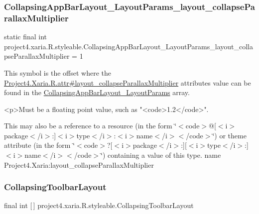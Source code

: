 \subsubsection{\texorpdfstring{Collapsing\+App\+Bar\+Layout\+\_\+\+Layout\+Params\+\_\+layout\+\_\+collapse\+Parallax\+Multiplier}{CollapsingAppBarLayout\_LayoutParams\_layout\_collapseParallaxMultiplier}}
{\footnotesize\ttfamily static final int project4.\+xaria.\+R.\+styleable.\+Collapsing\+App\+Bar\+Layout\+\_\+\+Layout\+Params\+\_\+layout\+\_\+collapse\+Parallax\+Multiplier = 1\hspace{0.3cm}{\ttfamily [static]}}

This symbol is the offset where the \hyperlink{}{Project4.\+Xaria.\+R.\+attr\#layout\+\_\+collapse\+Parallax\+Multiplier} attribute\textquotesingle{}s value can be found in the \hyperlink{classproject4_1_1xaria_1_1R_1_1styleable_a22d4439a4550b11fcac1b86a5aaca608}{Collapsing\+App\+Bar\+Layout\+\_\+\+Layout\+Params} array.

\begin{DoxyVerb}      <p>Must be a floating point value, such as "<code>1.2</code>".
\end{DoxyVerb}
 

This may also be a reference to a resource (in the form \char`\"{}$<$code$>$@\mbox{[}$<$i$>$package$<$/i$>$\+:\mbox{]}$<$i$>$type$<$/i$>$\+:$<$i$>$name$<$/i$>$$<$/code$>$\char`\"{}) or theme attribute (in the form \char`\"{}$<$code$>$?\mbox{[}$<$i$>$package$<$/i$>$\+:\mbox{]}\mbox{[}$<$i$>$type$<$/i$>$\+:\mbox{]}$<$i$>$name$<$/i$>$$<$/code$>$\char`\"{}) containing a value of this type.  name Project4.\+Xaria\+:layout\+\_\+collapse\+Parallax\+Multiplier \mbox{\label{classproject4_1_1xaria_1_1R_1_1styleable_ac131ed2b7e0e7f05b58231242478b839}} 
\subsubsection{\texorpdfstring{Collapsing\+Toolbar\+Layout}{CollapsingToolbarLayout}}
{\footnotesize\ttfamily final int \mbox{[}$\,$\mbox{]} project4.\+xaria.\+R.\+styleable.\+Collapsing\+Toolbar\+Layout\hspace{0.3cm}{\ttfamily [static]}}

